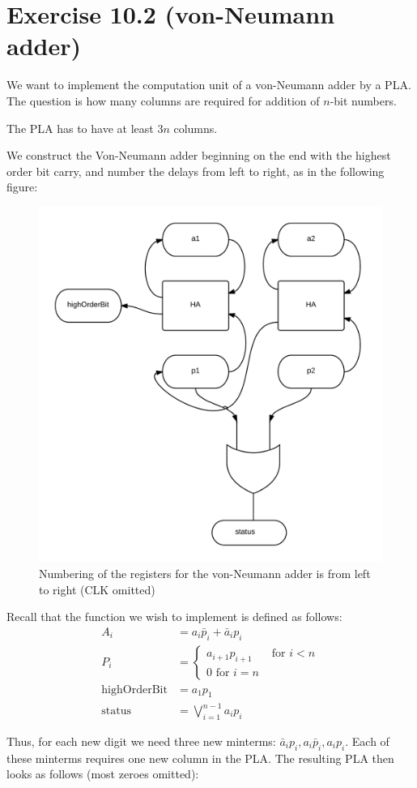 \documentclass[10pt,a4paper]{scrartcl}
\begin{document}
\FloatBarrier

\newpage
\section*{Exercise 10.2 (von-Neumann adder)}
We want to implement the computation unit of a von-Neumann adder by a PLA. 
The question is how many columns are required for addition of $n$-bit numbers.

 The PLA has to have at least $3n$ columns.

We construct the Von-Neumann adder beginning on the end with the highest order bit carry,
and number the delays from left to right, as in the following figure:
\begin{figure}[H]
  \centering\includegraphics[width=0.6\linewidth]{images/vonNeumannAdder.png}
  \caption{Numbering of the registers for the von-Neumann adder is from left to right (CLK omitted)}
\end{figure}

Recall that the function we wish to implement is defined as follows:
\begin{align*}
  A_i &= a_i \bar p_i + \bar a_i p_i \\
  P_i &= \left\{\begin{array}{ll} a_{i+1}p_{i+1} & \textrm{ for } i<n \\ 0 \textrm{ for } i = n \end{array}\right. \\
  \mathrm{highOrderBit} &= a_1 p_1 \\
  \mathrm{status} &= \bigvee_{i=1}^{n-1} a_i p_i
\end{align*}

Thus, for each new digit we need three new minterms: $\bar a_i p_i, a_i\bar p_i, a_i p_i$.
Each of these minterms requires one new column in the PLA. 
The resulting PLA then looks as follows (most zeroes omitted):
\end{document}
